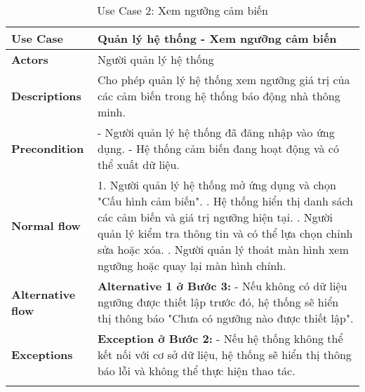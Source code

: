 \begin{longtable}{|p{}|p{}|}
    \hline
    \textbf{Use Case}         & \textbf{Quản lý hệ thống - Xem ngưỡng cảm biến}                                                       \\
    \hline
    \textbf{Actors}           & Người quản lý hệ thống                                                                                \\
    \hline
    \textbf{Descriptions}     & Cho phép quản lý hệ thống xem ngưỡng giá trị của các cảm biến trong hệ thống báo động nhà thông minh. \\
    \hline
    \textbf{Precondition}     &
    - Người quản lý hệ thống đã đăng nhập vào ứng dụng. \newline
    - Hệ thống cảm biến đang hoạt động và có thể xuất dữ liệu.                                                                        \\
    \hline
    \textbf{Normal flow}      &
    1. Người quản lý hệ thống mở ứng dụng và chọn "Cấu hình cảm biến". \newline
    2. Hệ thống hiển thị danh sách các cảm biến và giá trị ngưỡng hiện tại. \newline
    3. Người quản lý kiểm tra thông tin và có thể lựa chọn chỉnh sửa hoặc xóa. \newline
    4. Người quản lý thoát màn hình xem ngưỡng hoặc quay lại màn hình chính.                                                          \\
    \hline
    \textbf{Alternative flow} &
    \textbf{Alternative 1 ở Bước 3:} \newline
    - Nếu không có dữ liệu ngưỡng được thiết lập trước đó, hệ thống sẽ hiển thị thông báo "Chưa có ngưỡng nào được thiết lập".        \\
    \hline
    \textbf{Exceptions}       &
    \textbf{Exception ở Bước 2:} \newline
    - Nếu hệ thống không thể kết nối với cơ sở dữ liệu, hệ thống sẽ hiển thị thông báo lỗi và không thể thực hiện thao tác.           \\
    \hline
    \caption{Use Case 2: Xem ngưỡng cảm biến}
    \label{tab:usecase2}
\end{longtable}

